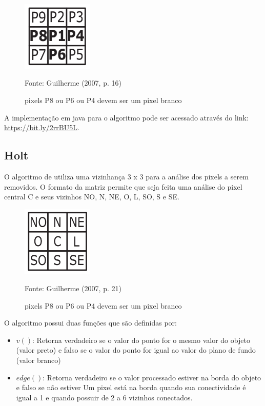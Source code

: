 \documentclass[
	12pt,				%
	oneside,			%
	a4paper,			%
	english,			%
	french,				%
	spanish,			%
	brazil,				%
	]{abntex2}
\begin{document}
\begin{figure}[ht]
\centering
\caption{pixels P8 ou P6 ou P4 devem ser um pixel branco}
\includegraphics[width=0.3\textwidth]{imagens/zhangsuen4.png}

Fonte: Guilherme (2007, p. 16)
\label{fig:zhangsuen4}
\end{figure}

A implementação em java para o algoritmo pode ser acessado através do link: \url{https://bit.ly/2rrBU5L}.

\subsection{Holt}    

O algoritmo de \citet{holt1987improved} utiliza uma vizinhança 3 x 3 para a análise dos pixels a serem removidos. O formato da matriz permite que seja feita uma análise do pixel central C e seus vizinhos NO, N, NE, O, L, SO, S e SE.

\begin{figure}[ht]
\centering
\caption{pixels P8 ou P6 ou P4 devem ser um pixel branco}
\includegraphics[width=0.3\textwidth]{imagens/holt.png}

Fonte: Guilherme (2007, p. 21)
\label{fig:holt}
\end{figure}

O algoritmo possui duas funções que são definidas por:

\begin{itemize}
\item \(v()\): Retorna verdadeiro se o valor do ponto for o mesmo valor do objeto (valor preto) e falso se o valor do ponto for igual ao valor do plano de fundo (valor branco)
\item \(edge()\): Retorna verdadeiro se o valor processado estiver na borda do objeto e falso se não estiver
\subitem Um pixel está na borda quando sua conectividade é igual a 1 e quando possuir de 2 a 6 vizinhos conectados. 
\end{itemize}
\end{document}
